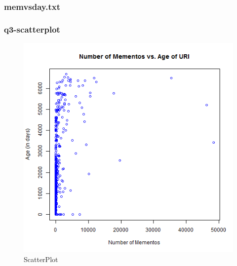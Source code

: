 
\newpage
\subsubsection{memvsday.txt}

\newpage
\subsubsection{q3-scatterplot}
\begin{figure}[ht]    
    \begin{center}
        \includegraphics[scale=0.60]{q3-scatterplot.png}
        \caption{ScatterPlot}
        \label{scatterPlot}
    \end{center}
\end{figure}
